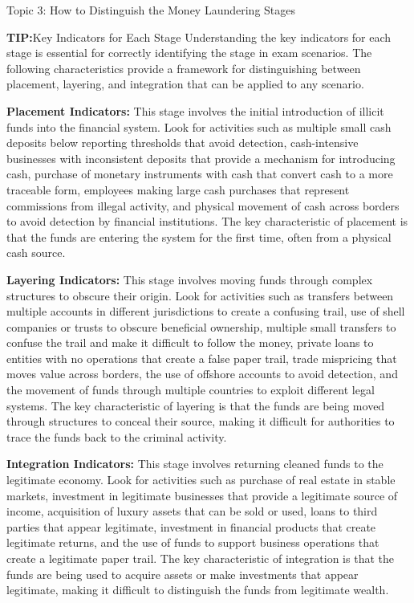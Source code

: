\documentclass[8pt]{beamer}  %
\newcommand{\tip}{\textcolor{infoblue}{\textbf{TIP:}}}
\begin{document}
	\begin{frame}{Topic 3: How to Distinguish the Money Laundering Stages}
		\begin{block}{\large \tip Key Indicators for Each Stage}
			Understanding the key indicators for each stage is essential for correctly identifying the stage in exam scenarios. The following characteristics provide a framework for distinguishing between placement, layering, and integration that can be applied to any scenario.
			
			\textbf{Placement Indicators:} This stage involves the initial introduction of illicit funds into the financial system. Look for activities such as multiple small cash deposits below reporting thresholds that avoid detection, cash-intensive businesses with inconsistent deposits that provide a mechanism for introducing cash, purchase of monetary instruments with cash that convert cash to a more traceable form, employees making large cash purchases that represent commissions from illegal activity, and physical movement of cash across borders to avoid detection by financial institutions. The key characteristic of placement is that the funds are entering the system for the first time, often from a physical cash source.
			
			\textbf{Layering Indicators:} This stage involves moving funds through complex structures to obscure their origin. Look for activities such as transfers between multiple accounts in different jurisdictions to create a confusing trail, use of shell companies or trusts to obscure beneficial ownership, multiple small transfers to confuse the trail and make it difficult to follow the money, private loans to entities with no operations that create a false paper trail, trade mispricing that moves value across borders, the use of offshore accounts to avoid detection, and the movement of funds through multiple countries to exploit different legal systems. The key characteristic of layering is that the funds are being moved through structures to conceal their source, making it difficult for authorities to trace the funds back to the criminal activity.
			
			\textbf{Integration Indicators:} This stage involves returning cleaned funds to the legitimate economy. Look for activities such as purchase of real estate in stable markets, investment in legitimate businesses that provide a legitimate source of income, acquisition of luxury assets that can be sold or used, loans to third parties that appear legitimate, investment in financial products that create legitimate returns, and the use of funds to support business operations that create a legitimate paper trail. The key characteristic of integration is that the funds are being used to acquire assets or make investments that appear legitimate, making it difficult to distinguish the funds from legitimate wealth.
			

\end{block}
\end{frame}
\end{document}
